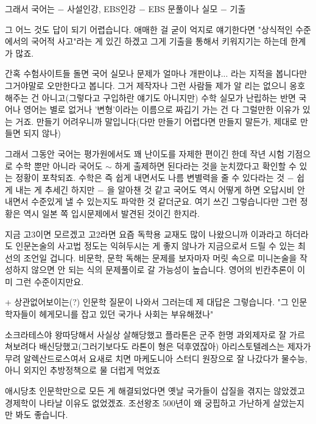 그래서 국어는
$-$ 사설인강, EBS인강
$-$ EBS 문풀이나 실모
$-$ 기출
\vspace{5mm}

그 어느 것도 답이 되기 어렵습니다.
애매한 걸 굳이 억지로 얘기한다면 "상식적인 수준에서의 국어적 사고"라는 게 있긴 하겠고
그게 기출을 통해서 키워지기는 하는데 한계가 많죠.
\vspace{5mm}

간혹 수험사이트들 돌면 국어 실모나 문제가 얼마나 개판이냐... 라는 지적을 봅니다만
그거야말로 오만한다고 봅니다. 그거 제작자나 그런 사람들 제가 알 리는 없으니 옹호해주는 건 아니고(그렇다고 구입하란 얘기도 아니지만)
수학 실모가 난립하는 반면 국어나 영어는 별로 없거나 '변형'이라는 이름으로 짜깁기 가는 건 다 그럴만한 이유가 있는 거죠.
만들기 어려우니까 말입니다(다만 만들기 어렵다면 만들지 말든가, 제대로 만들면 되지 않나)
\vspace{5mm}

그래서 그동안 국어는 평가원에서도 꽤 난이도를 자제한 편이긴 한데
작년 시험 기점으로 수학 뿐만 아니라 국어도 $\sim$ 하게 출제하면 된다라는 것을 눈치깠다고 확인할 수 있는 정황이 포착되죠.
수학은 즉 쉽게 내면서도 나름 변별력을 줄 수 있다라는 것 $-$ 쉽게 내는 게 추세긴 하지만 $-$ 을 알아챈 것 같고
국어도 역시 어떻게 하면 오답시비 안 내면서 수준있게 낼 수 있는지도 파악한 것 같더군요.
여기 쓰긴 그렇습니다만 그런 정황은 역시 일본 쪽 입시문제에서 발견된 것이긴 한지라.
\vspace{5mm}

지금 고3이면 모르겠고 고2라면
요즘 독학용 교재도 많이 나왔으니까 이과라고 하더라도 인문논술의 사고법 정도는 익혀두시는 게 좋지 않나가
지금으로서 드릴 수 있는 최선의 조언일 겁니다.
비문학, 문학 독해는 문제를 보자마자 머릿 속으로 미니논술을 작성하지 않으면 안 되는 식의 문제풀이로 갈 가능성이 높습니다.
영어의 빈칸추론이 이미 그런 수준이지만요.
\vspace{5mm}

+ 상관없어보이는(?) 인문학 질문이 나와서 그러는데 제 대답은 그렇습니다.
"그 인문학자들이 헤게모니를 잡고 있던 국가나 사회는 부유해졌나"
\vspace{5mm}

소크라테스야 왕따당해서 사실상 살해당했고
플라톤은 군주 한명 과외제자로 잘 가르쳐보려다 배신당했고(그러기보다도 라톤이 형은 덕후였잖아)
아리스토텔레스는 제자가 무려 알렉산드로스여서 요새로 치면 마케도니아 스터디 원장으로 잘 나갔다가
물수능, 아니 외지인 추방정책으로 물 더럽게 먹었죠
\vspace{5mm}

애시당초 인문학만으로 모든 게 해결되었다면 옛날 국가들이 삽질을 겪지는 않았겠고
경제학이 나타날 이유도 없었겠죠.
조선왕조 500년이 왜 궁핍하고 가난하게 살았는지만 봐도 좋습니다.
\vspace{5mm}

